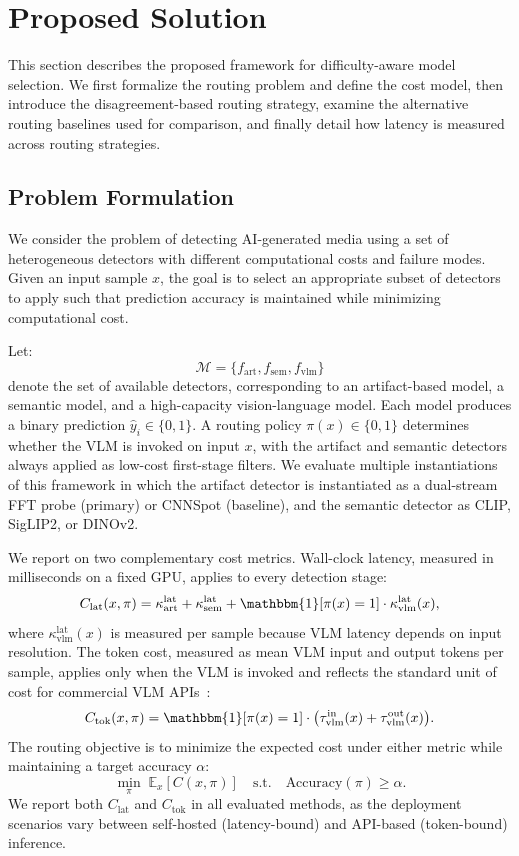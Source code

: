 \documentclass{ieeeaccess}
\begin{document}
\section{Proposed Solution}
This section describes the proposed framework for difficulty-aware model selection. We first formalize the routing problem and define the cost model, then introduce the disagreement-based routing strategy, examine the alternative routing baselines used for comparison, and finally detail how latency is measured across routing strategies.

\subsection{Problem Formulation}

We consider the problem of detecting AI-generated media using a set of heterogeneous detectors with different computational costs and failure modes. Given an input sample $x$, the goal is to select an appropriate subset of detectors to apply such that prediction accuracy is maintained while minimizing computational cost.

Let:
\[
\mathcal{M} = \{f_{\text{art}}, f_{\text{sem}}, f_{\text{vlm}}\}
\]
denote the set of available detectors, corresponding to an artifact-based model, a semantic model, and a high-capacity vision-language model. Each model produces a binary prediction $\hat{y}_i \in \{0,1\}$. A routing policy $\pi(x) \in \{0,1\}$ determines whether the VLM is invoked on input $x$, with the artifact and semantic detectors always applied as
low-cost first-stage filters. We evaluate multiple instantiations of this framework in which the artifact detector is instantiated as a dual-stream FFT probe (primary) or CNNSpot
(baseline), and the semantic detector as CLIP, SigLIP2, or DINOv2.

We report on two complementary cost metrics. Wall-clock latency, measured in milliseconds on a fixed GPU, applies to every detection stage:
\[
C_{\text{lat}}(x, \pi) = \kappa^{\text{lat}}_{\text{art}} + \kappa^{\text{lat}}_{\text{sem}}
+ \mathbbm{1}[\pi(x)=1] \cdot \kappa^{\text{lat}}_{\text{vlm}}(x),
\]
where $\kappa^{\text{lat}}_{\text{vlm}}(x)$ is measured per sample because VLM latency depends on input resolution. The token cost, measured as mean VLM input and output tokens per sample, applies only when the VLM is invoked and reflects the standard unit of cost for commercial VLM APIs~\cite{chen2024frugalgpt}:
\[
C_{\text{tok}}(x, \pi) = \mathbbm{1}[\pi(x)=1] \cdot \bigl(\tau^{\text{in}}_{\text{vlm}}(x)
+ \tau^{\text{out}}_{\text{vlm}}(x)\bigr).
\]
The routing objective is to minimize the expected cost under either metric while maintaining a target accuracy $\alpha$:
\[
\min_{\pi} \; \mathbb{E}_x[C(x, \pi)] \quad \text{s.t.} \quad \text{Accuracy}(\pi) \geq \alpha.
\]
We report both $C_{\text{lat}}$ and $C_{\text{tok}}$ in all evaluated methods, as the deployment scenarios vary between self-hosted (latency-bound) and API-based (token-bound) inference.
\end{document}
